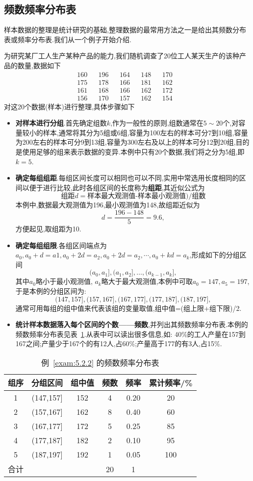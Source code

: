 \subsection{频数频率分布表}
样本数据的整理是统计研究的基础,整理数据的最常用方法之一是给出其频数分布表或频率分布表.我们从一个例子开始介绍.
\begin{example}\label{exam:5.2.2}
为研究某厂工人生产某种产品的能力,我们随机调查了20位工人某天生产的该种产品的数量,数据如下
\begin{align*}
160&&196&&164&&148&&170&\\
175&&178&&166&&181&&162&\\
161&&168&&166&&162&&172&\\
156&&170&&157&&162&&154&
\end{align*}
对这20个数据(样本)进行整理,具体步骤如下
\begin{itemize}
\item \textbf{对样本进行分组}.首先确定组数$k$,作为一般性的原则,组数通常在$5\sim20$个,对容量较小的样本,通常将其分为5组或6组,容量为100左右的样本可分7到10组,容量为200左右的样本可分9到13组,容量为300左右及以上的样本可分12到20组,目的是使用足够的组来表示数据的变异.本例中只有20个数据,我们将之分为5组,即$k=5$.
\item \textbf{确定每组组距}.每组区间长度可以相同也可以不同,实用中常选用长度相同的区间以便于进行比较,此时各组区间的长度称为\textbf{组距},其近似公式为
\[\text{组距}d=\text{样本最大观测值-样本最小观测值)}/\text{组数}\]
本例中,数据最大观测值为196,最小观测值为148,故组距近似为
\[d=\frac{196-148}5=9.6,\]
方便起见,取组距为10.
\item \textbf{确定每组组限}.各组区间端点为$a_0,a_0+d=a1,a_0+2d=a_2,a_0+2d=a_2,\cdots,a_0+kd=a_k$,形成如下的分组区间
\[(a_0,a_1],(a_1,a_2],\dotsc,(a_{k-1},a_k],\]
其中$a_0$略小于最小观测值, $a_k$略大于最大观测值,本例中可取$a_0=147,a_5=197$,于是本例的分组区间为:
\[(147,157],(157,167],(167,177],(177,187],(187,197],\]
通常可用每组的组中值来代表该组的变量取值,组中值=(组上限$+$组下限)/2.
\item \textbf{统计样本数据落入每个区间的个数——频数},并列出其频数频率分布表.本例的频数频率分布表见表~\ref{table5.2.1}.从表中可以读出很多信息,如: 40\%的工人产量在157到167之间;产量少于167个的有12人,占60\%;产量高于177的有3人,占15\%.
\end{itemize}
\end{example}
\begin{table}[!htp]
  \centering
  \caption{例~\ref{exam:5.2.2} 的频数频率分布表}\label{table5.2.1}
\begin{tabularx}{0.7\textwidth}{cccccc}
\toprule
组序&分组区间&组中值&频数&频率&累计频率/\%\\
\midrule
1&(147,157]&152&4&0.20&20\\
2&(157,167]&162&8&0.40&60\\
3&(167,177]&172&5&0.25&85\\
4&(177,187]&182&2&0.10&95\\
5&(187,197]&192&1&0.05&100\\
合计&&&20&1&\\
\bottomrule
\end{tabularx}
\end{table}
